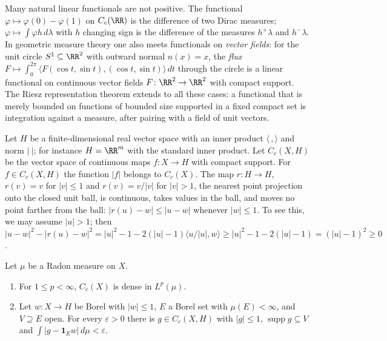 Many natural linear functionals are not positive. The functional $\varphi \mapsto \varphi(0) - \varphi(1)$ on $C_c(\RR)$ is the difference of two Dirac measures; $\varphi \mapsto \int\varphi h\,d\lambda$ with $h$
changing sign is the difference of the measures $h^+\lambda$ and $h^-\lambda$. In geometric measure theory one also meets functionals on \emph{vector fields}: for the unit circle $S^1 \subseteq \RR^2$ with
outward normal $n(x) = x$, the \emph{flux} $F \mapsto \int_0^{2\pi}\langle F(\cos t, \sin t), (\cos t, \sin t)\rangle\,dt$ through the circle is a linear functional on continuous vector fields $F \colon \RR^2 \to \RR^2$ with compact support. The
Riesz representation theorem extends to all these cases: a functional that is merely bounded on functions of bounded size supported in a fixed compact set is integration against a measure, after pairing with
a field of unit vectors.

Let $H$ be a finite-dimensional real vector space with an inner product $\langle\,,\rangle$ and norm $|\ |$; for instance $H = \RR^m$ with the standard inner product. Let $C_c(X, H)$ be the vector space of
continuous maps $f \colon X \to H$ with compact support. For $f \in C_c(X, H)$ the function $|f|$ belongs to $C_c(X)$. The map $r \colon H \to H$, $r(v) = v$ for $|v| \leq 1$ and $r(v) = v/|v|$ for $|v| > 1$, the
nearest point projection onto the closed unit ball, is continuous, takes values in the ball, and moves no point farther from the ball: $|r(u) - w| \leq |u - w|$ whenever $|w| \leq 1$. To see this,
we may assume $|u| > 1$; then
$|u - w|^2 - |r(u) - w|^2 = |u|^2 - 1 - 2(|u| - 1)\langle u/|u|, w\rangle \geq |u|^2 - 1 - 2(|u| - 1) = (|u| - 1)^2 \geq 0$.

\begin{lemma}\label{radon-measures:lemma-radon-approximation}
Let $\mu$ be a Radon measure on $X$.
\begin{enumerate}
\item For $1 \leq p < \infty$, $C_c(X)$ is dense in $L^p(\mu)$.
\item Let $w \colon X \to H$ be Borel with $|w| \leq 1$, $E$ a Borel set with $\mu(E) < \infty$, and $V \supseteq E$ open. For every $\varepsilon > 0$ there is $g \in C_c(X, H)$ with $|g| \leq 1$,
$\operatorname{supp}g \subseteq V$ and $\int|g - \mathbf{1}_Ew|\,d\mu < \varepsilon$.
\end{enumerate}
\end{lemma}

